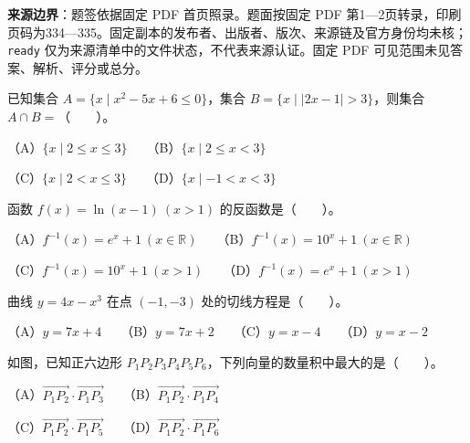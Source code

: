 

\begin{gktip}
\textbf{来源边界}：题签依据固定 PDF 首页照录。题面按固定 PDF 第1—2页转录，印刷页码为334—335。固定副本的发布者、出版者、版次、来源链及官方身份均未核；\texttt{ready} 仅为来源清单中的文件状态，不代表来源认证。固定 PDF 可见范围未见答案、解析、评分或总分。
\end{gktip}


\begin{question}
已知集合 $A=\{x\mid x^2-5x+6\leqslant0\}$，集合 $B=\{x\mid |2x-1|>3\}$，则集合 $A\cap B=$\mbox{（　　）}。

（A）$\{x\mid 2\leqslant x\leqslant3\}$　　（B）$\{x\mid 2\leqslant x<3\}$

（C）$\{x\mid 2<x\leqslant3\}$　　（D）$\{x\mid -1<x<3\}$

\end{question}
\begin{question}
函数 $f(x)=\ln(x-1)\ (x>1)$ 的反函数是\mbox{（　　）}。

（A）$f^{-1}(x)=e^x+1\ (x\in\mathbb R)$　　（B）$f^{-1}(x)=10^x+1\ (x\in\mathbb R)$

（C）$f^{-1}(x)=10^x+1\ (x>1)$　　（D）$f^{-1}(x)=e^x+1\ (x>1)$

\end{question}
\begin{question}
曲线 $y=4x-x^3$ 在点 $(-1,-3)$ 处的切线方程是\mbox{（　　）}。

（A）$y=7x+4$　　（B）$y=7x+2$　　（C）$y=x-4$　　（D）$y=x-2$

\Needspace{0.4\textheight}
\end{question}
\begin{question}
如图，已知正六边形 $P_1P_2P_3P_4P_5P_6$，下列向量的数量积中最大的是\mbox{（　　）}。
\nopagebreak[4]
\begin{center}\end{center}
\nopagebreak[4]
（A）$\overrightarrow{P_1P_2}\cdot\overrightarrow{P_1P_3}$　　（B）$\overrightarrow{P_1P_2}\cdot\overrightarrow{P_1P_4}$

（C）$\overrightarrow{P_1P_2}\cdot\overrightarrow{P_1P_5}$　　（D）$\overrightarrow{P_1P_2}\cdot\overrightarrow{P_1P_6}$

\end{question}
